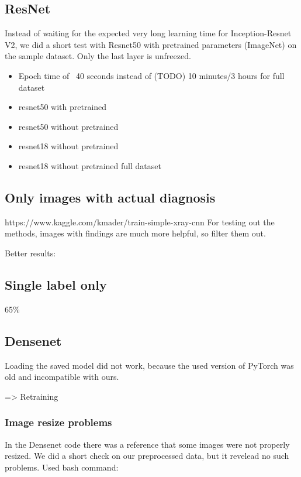 
\subsection{ResNet}

Instead of waiting for the expected very long learning time for Inception-Resnet V2, we did a short test with Resnet50 with pretrained parameters (ImageNet) on the sample dataset. Only the last layer is unfreezed.

\begin{itemize}
    \item Epoch time of ~40 seconds instead of (TODO) 10 minutes/3 hours for full dataset
    \item resnet50 with pretrained
    \item resnet50 without pretrained
    \item resnet18 without pretrained
    \item resnet18 without pretrained full dataset
\end{itemize}

\subsection{Only images with actual diagnosis}
https://www.kaggle.com/kmader/train-simple-xray-cnn 
For testing out the methods, images with findings are much more helpful, so filter them out.

Better results:


\subsection{Single label only}
65\%

\subsection{Densenet}




Loading the saved model did not work, because the used version of PyTorch was old and incompatible with ours.

=> Retraining

\subsubsection{Image resize problems}
In the Densenet code there was a reference that some images were not properly resized. We did a short check on our preprocessed data, but it revelead no such problems. Used bash command:

